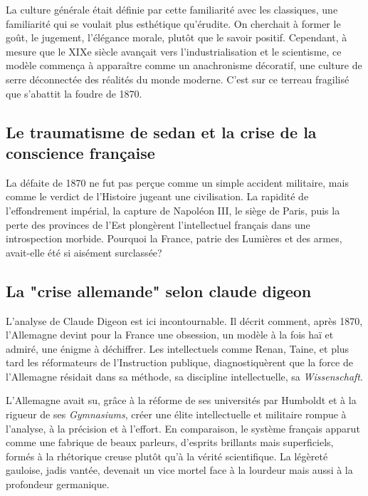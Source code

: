 La \og culture générale\fg{} était définie par cette familiarité avec les classiques, une
familiarité qui se voulait plus esthétique qu'érudite. On cherchait à former le goût, le jugement,
l'élégance morale, plutôt que le savoir positif. Cependant, à mesure que le XIXe siècle avançait
vers l'industrialisation et le scientisme, ce modèle commença à apparaître comme un anachronisme
décoratif, une \og culture de serre\fg{} déconnectée des réalités du monde moderne. C'est sur ce
terreau fragilisé que s'abattit la foudre de 1870.



\subsection{Le traumatisme de sedan et la crise de la conscience française}

La défaite de 1870 ne fut pas perçue comme un simple accident militaire, mais comme le verdict de
l'Histoire jugeant une civilisation. La rapidité de l'effondrement impérial, la capture de Napoléon
III, le siège de Paris, puis la perte des provinces de l'Est plongèrent l'intellectuel français dans
une introspection morbide. Pourquoi la France, patrie des Lumières et des armes, avait-elle été si
aisément surclassée?



\subsection{La "crise allemande" selon claude digeon}

L'analyse de Claude Digeon est ici incontournable. Il décrit comment, après 1870, l'Allemagne devint
pour la France une obsession, un modèle à la fois haï et admiré, une énigme à
déchiffrer.\cite{I-1-1-ref1} Les intellectuels comme Renan, Taine, et plus tard les réformateurs de
l'Instruction publique, diagnostiquèrent que la force de l'Allemagne résidait dans sa méthode, sa
discipline intellectuelle, sa \textit{Wissenschaft}.

L'Allemagne avait su, grâce à la réforme de ses universités par Humboldt et à la rigueur de ses
\textit{Gymnasiums}, créer une élite intellectuelle et militaire rompue à l'analyse, à la précision
et à l'effort. En comparaison, le système français apparut comme une fabrique de \og beaux
parleurs\fg{}, d'esprits brillants mais superficiels, formés à la rhétorique creuse plutôt qu'à la
vérité scientifique. La \og légèreté gauloise\fg{}, jadis vantée, devenait un vice mortel face à la
\og lourdeur\fg{} mais aussi à la \og profondeur\fg{} germanique.\cite{I-1-1-ref1}



